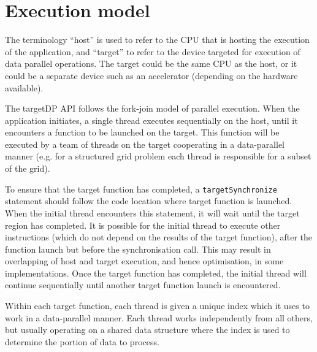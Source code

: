 \chapter{Execution model}

The terminology ``host'' is used to refer to the CPU that is hosting
the execution of the application, and ``target'' to refer to the
device targeted for execution of data parallel operations. The target
could be the same CPU as the host, or it could be a separate device such
as an accelerator (depending on the hardware available). 

The targetDP API follows the fork-join model of parallel
execution. When the application initiates, a single thread executes
sequentially on the host, until it encounters a function to be
launched on the target. This function will be executed by a team of
threads on the target cooperating in a data-parallel manner (e.g. for
a structured grid problem each thread is responsible for a subset of
the grid). 

To ensure that the target function has completed, a
\verb+targetSynchronize+ statement should follow the code location
where target function is launched. When the initial thread encounters
this statement, it will wait until the target region has completed. It
is possible for the initial thread to execute other instructions
(which do not depend on the results of the target function), after the
function launch but before the synchronisation call. This may result in
overlapping of host and target execution, and hence optimisation, in
some implementations. Once the target function has completed, the
initial thread will continue sequentially until another target
function launch is encountered.

Within each target function, each thread is given a unique index which
it uses to work in a data-parallel manner. Each thread works
independently from all others, but usually operating on a shared data
structure where the index is used to determine the portion of data
to process.

\begin{comment}
Possibly add targetSyncThreads() to
  allow communication within target functions?]
\end{comment}

\begin{comment}
Some text on reductions needed.
\end{comment}
